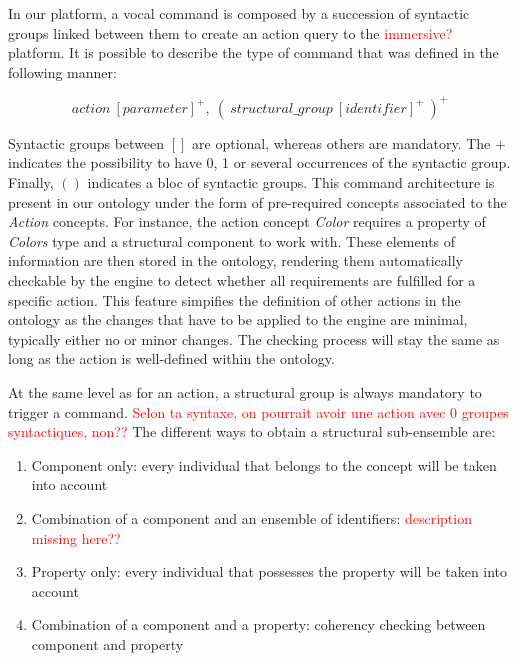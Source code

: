 \documentclass{vgtc}                          %
\newcommand*\mvb[1]{\textcolor{red}{#1}}
\begin{document}
In our platform, a vocal command is composed by a succession of syntactic groups linked between them to create an action query to the \mvb{immersive?} platform. It is possible to describe the type of command that was defined in the following manner:

$$action\ [parameter]^+,\ (\ structural\_group\ [identifier]^+\ )^+$$

Syntactic groups between $[]$ are optional, whereas others are mandatory. The $+$ indicates the possibility to have 0, 1 or several occurrences of the syntactic group. Finally, $()$ indicates a bloc of syntactic groups. This command architecture is present in our ontology under the form of pre-required concepts associated to the \textit{Action} concepts. For instance, the action concept \textit{Color} requires a property of \textit{Colors} type and a structural component to work with. These elements of information are then stored in the ontology, rendering them automatically checkable by the engine to detect whether all requirements are fulfilled for a specific action. This feature simpifies the definition of other actions in the ontology as the changes that have to be applied to the engine are minimal, typically either no or minor changes. The checking process will stay the same as long as the action is well-defined within the ontology.

At the same level as for an action, a structural group is always mandatory to trigger a command. \mvb{Selon ta syntaxe, on pourrait avoir une action avec 0 groupes syntactiques, non??} The different ways to obtain a structural sub-ensemble are:

\begin{enumerate}
  \item Component only: every individual that belongs to the concept will be taken into account
  \item Combination of a component and an ensemble of identifiers: \mvb{description missing here??} 
  \item Property only: every individual that possesses the property will be taken into account
  \item Combination of a component and a property: coherency checking between component and property
\end{enumerate}
\end{document}
